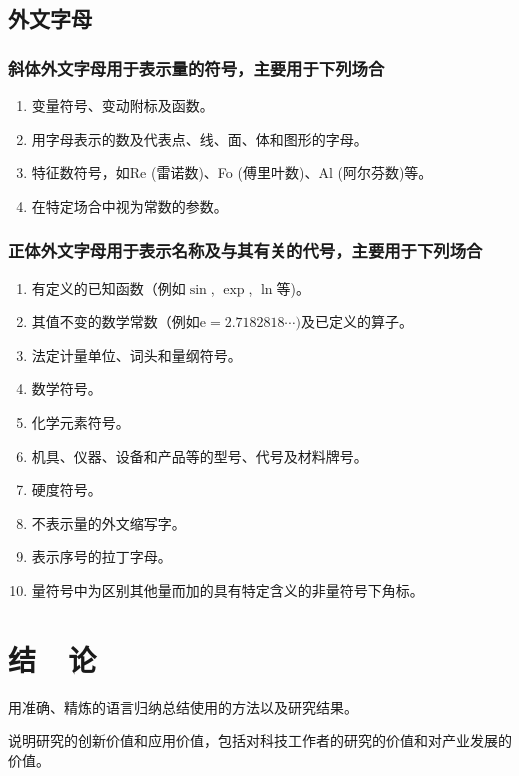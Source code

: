 \documentclass{iceli}
\begin{document}
\subsection{外文字母}
\subsubsection{斜体外文字母用于表示量的符号，主要用于下列场合}

\begin{enumerate}
\renewcommand{\labelenumi}{(\theenumi)}
\item 变量符号、变动附标及函数。
\item 用字母表示的数及代表点、线、面、体和图形的字母。
\item 特征数符号，如Re (雷诺数)、Fo (傅里叶数)、Al (阿尔芬数)等。
\item 在特定场合中视为常数的参数。
\end{enumerate} 

\subsubsection{正体外文字母用于表示名称及与其有关的代号，主要用于下列场合}
\begin{enumerate}
\renewcommand{\labelenumi}{(\theenumi)}
\item 有定义的已知函数（例如$\sin$, $\exp$, $\ln$等)。
\item 其值不变的数学常数（例如$\mathrm{e} = 2.718 281 8\cdots)$及已定义的算子。
\item 法定计量单位、词头和量纲符号。
\item 数学符号。
\item 化学元素符号。
\item 机具、仪器、设备和产品等的型号、代号及材料牌号。
\item 硬度符号。
\item 不表示量的外文缩写字。
\item 表示序号的拉丁字母。
\item 量符号中为区别其他量而加的具有特定含义的非量符号下角标。
\end{enumerate} 

\section{结~~论}
用准确、精炼的语言归纳总结使用的方法以及研究结果。

说明研究的创新价值和应用价值，包括对科技工作者的研究的价值和对产业发展的价值。
\end{document}
